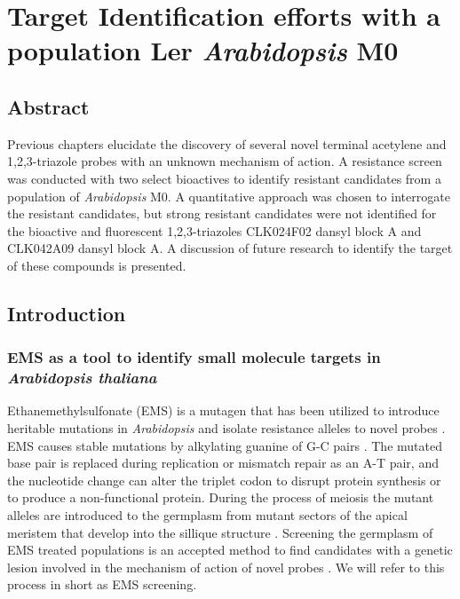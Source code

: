 \chapter{Target Identification efforts with a population Ler {\it Arabidopsis} M0}

\section{Abstract}

Previous chapters elucidate the discovery of several novel terminal acetylene and 1,2,3-triazole probes with an unknown mechanism of action. A resistance screen was conducted with two select bioactives to identify resistant candidates from a population of {\it Arabidopsis} M0. A quantitative approach was chosen to interrogate the resistant candidates, but strong resistant candidates were not identified for the bioactive and fluorescent 1,2,3-triazoles CLK024F02 dansyl block A and CLK042A09 dansyl block A. A discussion of future research to identify the target of these compounds is presented.

\section{Introduction} 

\subsection{EMS as a tool to identify small molecule targets in {\it Arabidopsis thaliana}}

Ethanemethylsulfonate (EMS) is a mutagen that has been utilized to introduce heritable mutations in {\it Arabidopsis} and isolate resistance alleles to novel probes \cite{EMS_Arabidopsis,park_2009}. EMS causes stable mutations by alkylating guanine of G-C pairs \cite{westhoff1998molecular}. The mutated base pair is replaced during replication or mismatch repair as an A-T pair, and the nucleotide change can alter the triplet codon to disrupt protein synthesis or to produce a non-functional protein. During the process of meiosis the mutant alleles are introduced to the germplasm from mutant sectors of the apical meristem that develop into the sillique structure \cite{westhoff1998molecular}. Screening the germplasm of EMS treated populations is an accepted method to find candidates with a genetic lesion involved in the mechanism of action of novel probes \cite{Zhao_Hyr1}. We will refer to this process in short as EMS screening.

